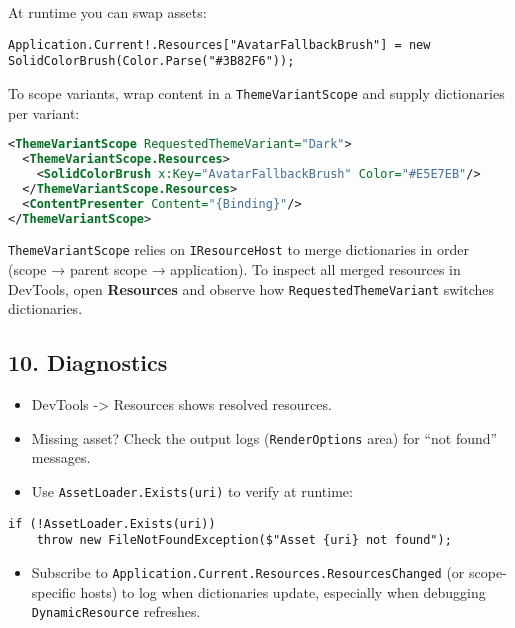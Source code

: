 At runtime you can swap assets:

\begin{lstlisting}
Application.Current!.Resources["AvatarFallbackBrush"] = new SolidColorBrush(Color.Parse("#3B82F6"));
\end{lstlisting}

To scope variants, wrap content in a
\passthrough{\lstinline!ThemeVariantScope!} and supply dictionaries per
variant:

\begin{lstlisting}[language=XML]
<ThemeVariantScope RequestedThemeVariant="Dark">
  <ThemeVariantScope.Resources>
    <SolidColorBrush x:Key="AvatarFallbackBrush" Color="#E5E7EB"/>
  </ThemeVariantScope.Resources>
  <ContentPresenter Content="{Binding}"/>
</ThemeVariantScope>
\end{lstlisting}

\passthrough{\lstinline!ThemeVariantScope!} relies on
\passthrough{\lstinline!IResourceHost!} to merge dictionaries in order
(scope → parent scope → application). To inspect all merged resources in
DevTools, open \textbf{Resources} and observe how
\passthrough{\lstinline!RequestedThemeVariant!} switches dictionaries.

\subsection{10. Diagnostics}\label{diagnostics}

\begin{itemize}
\tightlist
\item
  DevTools -\textgreater{} Resources shows resolved resources.
\item
  Missing asset? Check the output logs
  (\passthrough{\lstinline!RenderOptions!} area) for ``not found''
  messages.
\item
  Use \passthrough{\lstinline!AssetLoader.Exists(uri)!} to verify at
  runtime:
\end{itemize}

\begin{lstlisting}
if (!AssetLoader.Exists(uri))
    throw new FileNotFoundException($"Asset {uri} not found");
\end{lstlisting}

\begin{itemize}
\tightlist
\item
  Subscribe to
  \passthrough{\lstinline!Application.Current.Resources.ResourcesChanged!}
  (or scope-specific hosts) to log when dictionaries update, especially
  when debugging \passthrough{\lstinline!DynamicResource!} refreshes.
\end{itemize}

